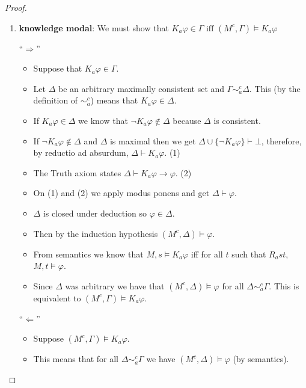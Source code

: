 \documentclass[12pt]{article}
\numberwithin{equation}{section}
\theoremstyle{definition}
\theoremstyle{definition}
\theoremstyle{remark}
\begin{document}
\begin{proof}
\begin{enumerate}
    
    \item \textbf{knowledge modal}: We must show that $K_a\varphi \in \Gamma \text{ iff } ( M^c, \Gamma ) \models K_a\varphi$
    
    ``$\Longrightarrow$''
    \begin{itemize}
    \item Suppose that $K_a\varphi \in \Gamma$.
    \item Let $\Delta$ be an arbitrary maximally consistent set and $\Gamma \sim ^c_a \Delta$. This (by the definition of $\sim ^c_a$) means that $K_a \varphi \in \Delta$.
    
    \item If $K_a\varphi \in \Delta$ we know that $\neg K_a\varphi \notin \Delta$ because $\Delta$ is consistent.
    
    \item If $\neg K_a\varphi \notin \Delta $ and $\Delta$ is maximal then we get $\Delta \cup \{\neg K_a\varphi \} \vdash \bot$, therefore, by reductio ad absurdum, $\Delta \vdash K_a\varphi$. (1)
    
    \item The Truth axiom states $\Delta \vdash K_a \varphi \rightarrow \varphi$. (2)
    
    \item On (1) and (2) we apply modus ponens and get $\Delta \vdash \varphi$.
    
    \item $\Delta$ is closed under deduction so $\varphi \in \Delta $.
    \item Then by the induction hypothesis $(M^c, \Delta) \models \varphi$.
    
    \item From semantics we know that $M, s \models K_a\varphi$ iff for all $t$ such that $R_a st$,  $M, t \models \varphi$.
    \item Since $\Delta$ was arbitrary we have that $(M^c, \Delta) \models \varphi$ for all $\Delta \sim^c_a \Gamma$. This is equivalent to $(M^c, \Gamma) \models K_a\varphi$.
    \end{itemize}
    
    ``$\Longleftarrow$''
    \begin{itemize}
    \item Suppose $(M^c, \Gamma) \models K_a \varphi$.
    
    \item This means that for all $ \Delta \sim ^c_a \Gamma$ we have $(M^c, \Delta) \models \varphi$  (by semantics).
    

\end{itemize}
\end{enumerate}
\end{proof}
\end{document}
